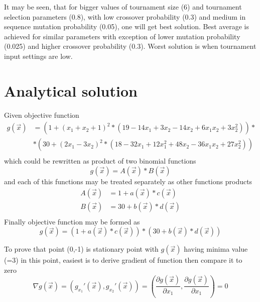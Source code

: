 \documentclass[main.tex]{subfiles}
\begin{document}
It may be seen, that for bigger values of tournament size (6) and tournament selection parameters (0.8), with low crossover probability (0.3) and medium in sequence mutation probability (0.05), one will get best solution. Best average is achieved for similar parameters with exception of lower mutation probability (0.025)  and higher crossover probability (0.3). Worst solution is when tournament input settings are low.

\section{Analytical solution}

Given objective function 
\begin{equation}
\begin{split}
g(\vec{x})  &  = (1 + (x_1 + x_2 + 1)^2 * (19 - 14x_1 + 3x_2 - 14x_2 + 6x_1x_2 + 3x_2^2)) * \\
       & * (30 + (2x_1 - 3x_2)^2 * (18 - 32x_1 + 12x_1^2 + 48x_2 - 36x_1x_2 + 27x_2^2)) \\
\end{split}
\end{equation}
which could be rewritten as product of two binomial functions
\begin{equation}
    g(\vec{x}) = A(\vec{x})*B(\vec{x})
\end{equation}
and each of this functions may be treated separately as other functions products
\begin{equation}
\begin{split}
    A(\vec{x}) & = 1 + a(\vec{x})*c(\vec{x})\\
    B(\vec{x}) & = 30 + b(\vec{x})*d(\vec{x})\\
    \end{split}
\end{equation}
Finally objective function may be formed as 
\begin{equation}
    g(\vec{x}) = (1 + a(\vec{x})*c(\vec{x}))*( 30 + b(\vec{x})*d(\vec{x}))
\end{equation}

To prove that point (0,-1) is stationary point with $g(\vec{x})$ having minima value (=3) in this point, easiest is to derive gradient of function then compare it to zero
\begin{equation}
        \nabla{g(\vec{x})} = \left(g_{x_1}'(\vec{x}), g_{x_2}'(\vec{x})\right) = \left(\frac{\partial{g(\vec{x})} }{\partial{x_1}},
        \frac{\partial{g(\vec{x})} }{\partial{x_1}}\right) = 0
\end{equation}
\end{document}
